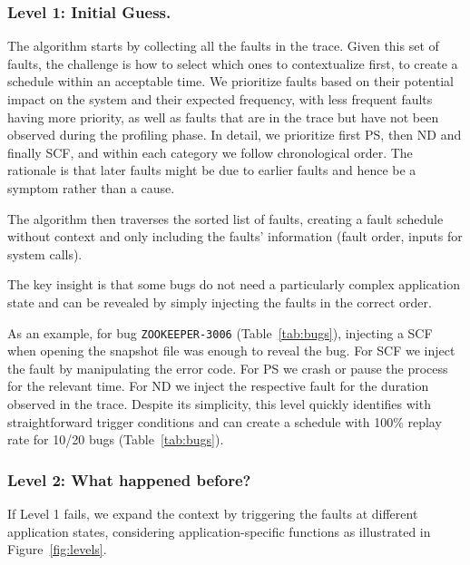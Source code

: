 \subsubsection{Level 1: Initial Guess.}
\label{sec:levelone}
The algorithm starts by collecting all the faults in the trace.
Given this set of faults, the challenge is how to select which ones to contextualize first, to create a schedule within an acceptable time.
We prioritize faults based on their potential impact on the system and their expected frequency, with less frequent faults having more priority, as well as faults that are in the trace but have not been observed during the profiling phase.
In detail, we prioritize first PS, then ND and finally SCF, and within each category we follow chronological order.
The rationale is that later faults might be due to earlier faults and hence be a symptom rather than a cause.

The algorithm then traverses the sorted list of faults, creating a fault schedule without context and only including the faults' information (fault order, inputs for system calls).

The key insight is that some bugs do not need a particularly complex application state and can be revealed by simply injecting the faults in the correct order.

As an example, for bug \texttt{ZOOKEEPER-3006} (Table~\ref{tab:bugs}), injecting a SCF when opening the snapshot file was enough to reveal the bug.
For SCF we inject the fault by manipulating the error code.
For PS we crash or pause the process for the relevant time.
For ND we inject the respective fault for the duration observed in the trace.
Despite its simplicity, this level quickly identifies \efibshort with straightforward trigger conditions and can create a schedule with 100\% replay rate for 10/20 bugs (Table~\ref{tab:bugs}).

\subsubsection{Level 2: What happened before?}
\label{sec:leveltwo}
If Level 1 fails, we expand the context by triggering the faults at different application states, considering application-specific functions as illustrated in Figure~\ref{fig:levels}.


